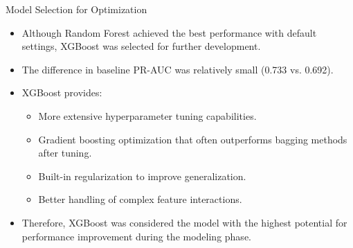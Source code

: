\begin{frame}{Model Selection for Optimization}
\begin{itemize}
\item Although Random Forest achieved the best performance with default settings, XGBoost was selected for further development.

\item The difference in baseline PR-AUC was relatively small (0.733 vs. 0.692).

\item XGBoost provides:
\begin{itemize}
    \item More extensive hyperparameter tuning capabilities.
    \item Gradient boosting optimization that often outperforms bagging methods after tuning.
    \item Built-in regularization to improve generalization.
    \item Better handling of complex feature interactions.
\end{itemize}

\item Therefore, XGBoost was considered the model with the highest potential for performance improvement during the modeling phase.

\end{itemize}
\end{frame}


